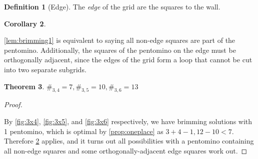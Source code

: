 \documentclass{article}
\theoremstyle{definition}%
\newtheorem{theorem}{Theorem}[section]
\newtheorem{corollary}[theorem]{Corollary}%
\newtheorem{definition}[theorem]{Definition}
\newcommand{\newterm}[1]{\textit{#1}}
\newcommand{\badterm}[1]{\textcolor{red}{\uwave{\textcolor{black}{#1}}}}
\begin{document}
\begin{definition}[Edge]
The \newterm{edge} of the grid are the squares \badterm{adjacent} to the wall.
\end{definition}

\begin{corollary}
\label{cor:brimming1}

\cref{lem:brimming1} is equivalent to saying all non-edge squares are part of the pentomino. Additionally, the squares of the pentomino on the edge must be orthogonally adjacent, since the edges of the grid form a loop that cannot be cut into two separate subgrids.
\end{corollary}

\begin{theorem}
$\#_{3, 4} = 7, \#_{3, 5} = 10, \#_{3, 6} = 13$
\end{theorem}

\begin{proof}
\label{th:3x4,5,6}

By \cref{fig:3x4}, \cref{fig:3x5}, and \cref{fig:3x6} respectively, we have brimming solutions with 1 pentomino, which is optimal by \cref{prop:oneplace} as $3 + 4 - 1, 12 - 10 < 7$. Therefore \cref{cor:brimming1} applies, and it turns out all possibilities with a pentomino containing all non-edge squares and some orthogonally-adjacent edge squares work out.
\end{proof}
\end{document}
